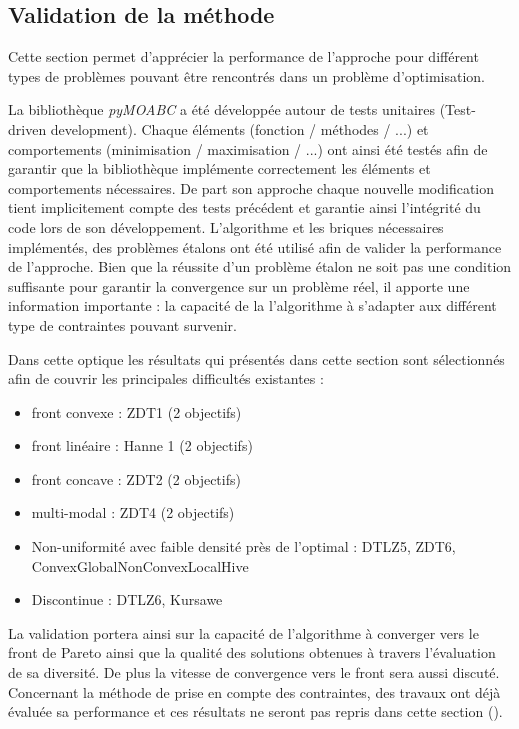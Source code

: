 \subsection{Validation de la méthode} %
\label{sub:validation_de_la_methode}


Cette section permet d’apprécier la performance de l’approche pour différent types
de problèmes pouvant être rencontrés dans un problème d’optimisation.

La bibliothèque \emph{pyMOABC} a été développée autour de tests unitaires
(Test-driven development).
Chaque éléments (fonction / méthodes / ...) et comportements (minimisation / maximisation / ...)
ont ainsi été testés afin de garantir que la bibliothèque implémente correctement
les éléments et comportements nécessaires. De part son approche chaque nouvelle
modification tient implicitement compte des tests précédent et garantie ainsi
l’intégrité du code lors de son développement.
L’algorithme et les briques nécessaires implémentés, des problèmes étalons ont été
utilisé afin de valider la performance de l’approche. Bien que la réussite d’un
problème étalon ne soit pas une condition suffisante pour garantir la convergence
sur un problème réel, il apporte une information importante : la capacité de la
l’algorithme à s’adapter aux différent type de contraintes pouvant survenir.

Dans cette optique les résultats qui présentés dans cette section sont sélectionnés
afin de couvrir les principales difficultés existantes :
\begin{itemize}
  \item front convexe : ZDT1 (2 objectifs)
  \item front linéaire : Hanne 1 (2 objectifs)
  \item front concave : ZDT2 (2 objectifs)
  \item multi-modal : ZDT4 (2 objectifs)
  \item Non-uniformité avec faible densité près de l’optimal : DTLZ5, ZDT6, ConvexGlobalNonConvexLocalHive
  \item Discontinue : DTLZ6, Kursawe
\end{itemize}
La validation portera ainsi sur la capacité de l’algorithme à converger vers le
front de Pareto ainsi que la qualité des solutions obtenues à travers l’évaluation
de sa diversité. De plus la vitesse de convergence vers le front sera aussi discuté.
Concernant la méthode de prise en compte des contraintes, des travaux ont déjà
évaluée sa performance et ces résultats ne seront pas repris dans cette section ().




